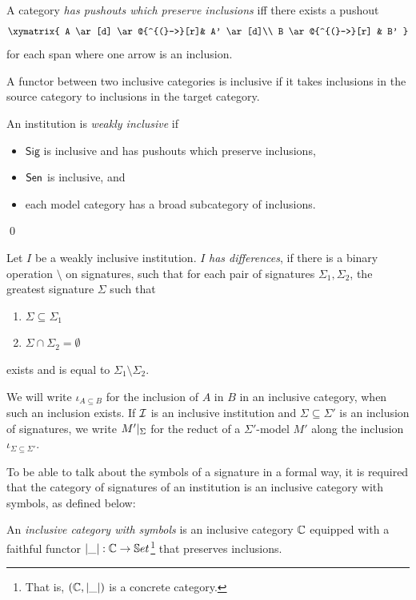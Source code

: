 \documentclass[10pt,fleqn,final]{scrreprt}
\newcommand{\Sig}{\mathsf{Sig}}
\newenvironment{definitions}[0]{\medskip }{}
\begin{document}
\begin{definitions}
\noindent
A category \emph{has pushouts which preserve inclusions} iff 
there exists a pushout
$$
\xymatrix{
  A  \ar[d] \ar@{^{(}->}[r]& A' \ar[d]\\
  B \ar@{^{(}->}[r] & B'
}
$$ for each span where one arrow is an inclusion.

A functor between two inclusive categories is inclusive if it takes inclusions in the source category to inclusions in the target category.

\begin{definition}
 An institution is \emph{weakly inclusive} if
   \begin{itemize}
     \item $\Sig$ is inclusive and has pushouts which preserve inclusions,
     \item $\mathsf{Sen}$ is inclusive, and
     \item each model category has a broad subcategory of inclusions.
   \end{itemize}
\qed\end{definition}

Let $I$ be a weakly inclusive institution.  $I$  \emph{has differences}, if there is a binary operation $\setminus$ on signatures, 
such that for each pair of signatures 
$\Sigma_1, \Sigma_2$, the greatest signature $\Sigma$ such that
\begin{enumerate}
  \item $\Sigma \subseteq \Sigma_1$
  \item $\Sigma \cap \Sigma_2 = \emptyset$
\end{enumerate} 
exists and is equal to $\Sigma_1\setminus \Sigma_2$.

We will write $\iota_{A\subseteq B}$ for the inclusion of $A$ in $B$ in an
inclusive category, when such an inclusion exists. If ${\cal I}$ is an inclusive institution
and $\Sigma\subseteq\Sigma'$ is an inclusion of signatures, we write 
$M'|_{\Sigma}$ for the reduct of a $\Sigma'$-model $M'$ along the inclusion
$\iota_{\Sigma\subseteq\Sigma'}$.

To be able to talk about the symbols of a signature in a formal way, it is required that the category of signatures of an institution is 
an inclusive category with symbols, as defined below:
\begin{definition}
An \emph{inclusive category with symbols} is an inclusive category
$\mathbb{C}$ equipped with a faithful functor $|\_|:\mathbb{C}\to\mathbb{S}et$\footnote{That is,
$(\mathbb{C},|\_|)$ is a concrete category.} that preserves
inclusions.
\end{definition}


\end{definitions}
\end{document}
